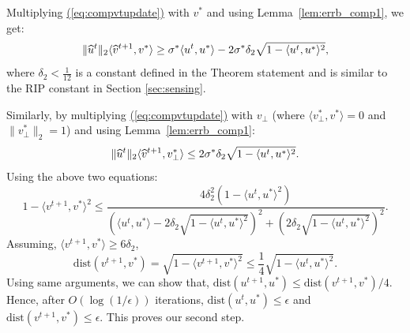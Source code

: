 \documentclass[11pt]{article}
\renewcommand{\eqref}[1]{\hyperref[#1]{(\ref*{#1})}}
\theoremstyle{plain}
\theoremstyle{definition}
\newcommand{\dist}{\mathrm{dist}}
\newcommand{\so}{\sigma^*}
\newcommand{\vto}{v^{t+1}}
\newcommand{\ut}{u^t}
\newcommand{\uo}{u^* }
\newcommand{\vo}{v^* }
\newcommand{\ip}[2]{\langle #1, #2 \rangle}
\newcommand{\vt}{\vto}
\begin{document}
Multiplying \eqref{eq:compvtupdate} with $\vo$ and using Lemma~\ref{lem:errb_comp1}, we get:
\begin{equation}
  \label{eq:ipvtvo_comp}
  \|\uht\|_2\ip{\widehat{v}^{t+1}}{\vo}\geq \so\ip{\ut}{\uo}-2\so\delta_2\sqrt{1-\ip{\ut}{\uo}^2},
\end{equation}
where $\delta_2<\frac{1}{12}$ is a constant defined in the Theorem statement and is similar to the RIP constant in Section \ref{sec:sensing}.%

Similarly, by multiplying \eqref{eq:compvtupdate} with $v_{\perp}$ (where $\ip{v_{\perp}^*}{\vo}=0$ and $\|v_{\perp}^*\|_2=1$) and using Lemma~\ref{lem:errb_comp1}:
$$\|\uht\|_2\ip{\widehat{v}^{t+1}}{v_{\perp}^*}\leq 2\so\delta_2\sqrt{1-\ip{\ut}{\uo}^2}.$$
Using the above two equations: 
\begin{equation*}1-\ip{\vt}{\vo}^2\leq \frac{4\delta_2^2( 1-\ip{\ut}{\uo}^2)}{(\ip{\ut}{\uo}-2\delta_2\sqrt{1-\ip{\ut}{\uo}^2})^2+(2\delta_2\sqrt{1-\ip{\ut}{\uo}^2})^2}.\end{equation*}
Assuming, $\ip{\vt}{\vo}\geq 6\delta_2$, $$\dist(\vt, \vo)=\sqrt{1-\ip{\vt}{\vo}^2}\leq \frac{1}{4}\sqrt{1-\ip{\ut}{\uo}^2}.$$
Using same arguments, we can show that, $\dist(u^{t+1}, \uo)\leq \dist(\vt, \vo)/4$. Hence, after $O(\log(1/\epsilon))$ iterations, $\dist(\ut, \uo)\leq \epsilon $ and $\dist(\vt, \vo)\leq \epsilon$. This proves our second step. 
\end{document}
